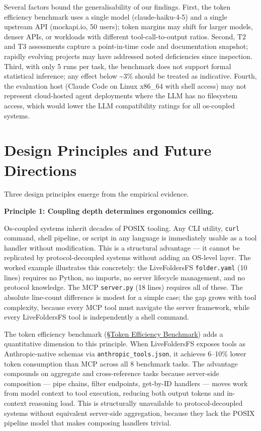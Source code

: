 \documentclass[
  11pt,
]{article}
\begin{document}
Several factors bound the generalisability of our findings. First, the
token efficiency benchmark uses a single model (claude-haiku-4-5) and a
single upstream API (mockapi.io, 50 users); token margins may shift for
larger models, denser APIs, or workloads with different
tool-call-to-output ratios. Second, T2 and T3 assessments capture a
point-in-time code and documentation snapshot; rapidly evolving projects
may have addressed noted deficiencies since inspection. Third, with only
5 runs per task, the benchmark does not support formal statistical
inference; any effect below \textasciitilde3\% should be treated as
indicative. Fourth, the evaluation host (Claude Code on Linux x86\_64
with shell access) may not represent cloud-hosted agent deployments
where the LLM has no filesystem access, which would lower the LLM
compatibility ratings for all os-coupled systems.

\hypertarget{design-principles-and-future-directions}{%
\section{Design Principles and Future
Directions}\label{design-principles-and-future-directions}}

Three design principles emerge from the empirical evidence.

\textbf{Principle 1: Coupling depth determines ergonomics ceiling.}

Os-coupled systems inherit decades of POSIX tooling. Any CLI utility,
\texttt{curl} command, shell pipeline, or script in any language is
immediately usable as a tool handler without modification. This is a
structural advantage --- it cannot be replicated by protocol-decoupled
systems without adding an OS-level layer. The worked example illustrates
this concretely: the LiveFoldersFS \texttt{folder.yaml} (10 lines)
requires no Python, no imports, no server lifecycle management, and no
protocol knowledge. The MCP \texttt{server.py} (18 lines) requires all
of these. The absolute line-count difference is modest for a simple
case; the gap grows with tool complexity, because every MCP tool must
navigate the server framework, while every LiveFoldersFS tool is
independently a shell command.

The token efficiency benchmark
(§\protect\hyperlink{token-efficiency-benchmark}{Token Efficiency
Benchmark}) adds a quantitative dimension to this principle. When
LiveFoldersFS exposes tools as Anthropic-native schemas via
\texttt{anthropic\_tools.json}, it achieves 6--10\% lower token
consumption than MCP across all 8 benchmark tasks. The advantage
compounds on aggregate and cross-reference tasks because server-side
composition --- pipe chains, filter endpoints, get-by-ID handlers ---
moves work from model context to tool execution, reducing both output
tokens and in-context reasoning load. This is structurally unavailable
to protocol-decoupled systems without equivalent server-side
aggregation, because they lack the POSIX pipeline model that makes
composing handlers trivial.
\end{document}
